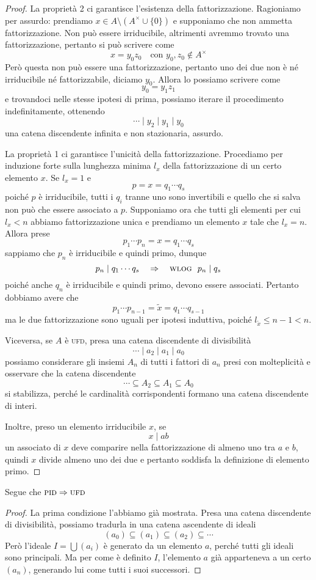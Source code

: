 \begin{multicols}{2}
\begin{proof}
	 La proprietà 2 ci garantisce l'esistenza della fattorizzazione. Ragioniamo per assurdo: prendiamo $ x \in A\setminus(A^\times \cup \{0\}) $ e supponiamo che non ammetta fattorizzazione. Non può essere irriducibile, altrimenti avremmo trovato una fattorizzazione, pertanto si può scrivere come
	\[ x = y_0z_0 \quad\text{con } y_0, z_0 \notin A^\times \]
	Però questa non può essere una fattorizzazione, pertanto uno dei due non è né irriducibile né fattorizzabile, diciamo $ y_0 $. Allora lo possiamo scrivere come
	\[ y_0 = y_1 z_1 \]
	e trovandoci nelle stesse ipotesi di prima, possiamo iterare il procedimento indefinitamente, ottenendo
	\[ \cdots \mid y_2 \mid y_1 \mid y_0 \]
	una catena discendente infinita e non stazionaria, assurdo.
	
	La proprietà 1 ci garantisce l'unicità della fattorizzazione. Procediamo per induzione forte sulla lunghezza minima $ l_x $ della fattorizzazione di un certo elemento $ x $. Se $ l_x = 1 $ e
	\[ p = x = q_1 \cdots q_s \]
	poiché $ p $ è irriducibile, tutti i $ q_i $ tranne uno sono invertibili e quello che si salva non può che essere associato a $ p $. Supponiamo ora che tutti gli elementi per cui $ l_x < n $ abbiamo fattorizzazione unica e prendiamo un elemento $ x $ tale che $ l_x = n $. Allora prese
	\[ p_1 \cdots p_n = x = q_1 \cdots q_s \]
	sappiamo che $ p_n $ è irriducibile e quindi primo, dunque
	\[ p_n \mid q_1 \cdots q_s \quad\Rightarrow\quad \textsc{wlog }\; p_n \mid q_s  \]
	poiché anche $ q_n $ è irriducibile e quindi primo, devono essere associati. Pertanto dobbiamo avere che
	\[ p_1 \cdots p_{n-1} = \tilde{x} = q_1 \cdots q_{s-1} \]
	ma le due fattorizzazione sono uguali per ipotesi induttiva, poiché $ l_{\tilde{x}} \leq n-1 < n $.
	
	Viceversa, se $ A $ è \textsc{ufd}, presa una catena discendente di divisibilità
	\[ \cdots \mid a_2 \mid a_1 \mid a_0 \]
	possiamo considerare gli insiemi $ A_n $ di tutti i fattori di $ a_n $ presi con molteplicità e osservare che la catena discendente
	\[ \cdots \subseteq A_2 \subseteq A_1 \subseteq A_0 \]
	si stabilizza, perché le cardinalità corrispondenti formano una catena discendente di interi.
	
	Inoltre, preso un elemento irriducibile $ x $, se
	\[ x \mid ab \]
	un associato di $ x $ deve comparire nella fattorizzazione di almeno uno tra $ a $ e $ b $, quindi $ x $ divide almeno uno dei due e pertanto soddisfa la definizione di elemento primo.
\end{proof}

\begin{remark}
	Segue che $ \textsc{pid}\Rightarrow \textsc{ufd} $
\end{remark}
\begin{proof}
	La prima condizione l'abbiamo già mostrata. Presa una catena discendente di divisibilità, possiamo tradurla in una catena ascendente di ideali
	\[ (a_0) \subseteq (a_1 ) \subseteq (a_2) \subseteq \cdots \]
	Però l'ideale $ I = \bigcup (a_i) $ è generato da un elemento $ a $, perché tutti gli ideali sono principali. Ma per come è definito $ I $, l'elemento $ a $ già apparteneva a un certo $ (a_n) $, generando lui come tutti i suoi successori. 
\end{proof}


\end{multicols}
